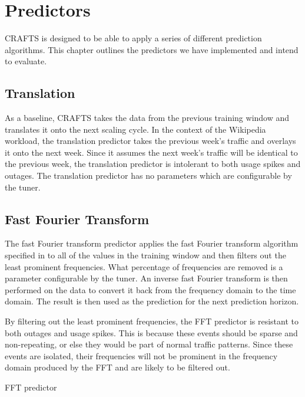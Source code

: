 \chapter{Predictors}
\label{ch:policies}
CRAFTS is designed to be able to apply a series of different prediction algorithms. This chapter outlines the predictors we have implemented and intend to evaluate.

\section{Translation}
As a baseline, CRAFTS takes the data from the previous training window and translates it onto the next scaling cycle. In the context of the Wikipedia workload, the translation predictor takes the previous week's traffic and overlays it onto the next week. Since it assumes the next week's traffic will be identical to the previous week, the translation predictor is intolerant to both usage spikes and outages. The translation predictor has no parameters which are configurable by the \textsf{tuner}.

\section{Fast Fourier Transform}
The fast Fourier transform predictor applies the fast Fourier transform algorithm specified in  to all of the values in the training window and then filters out the least prominent frequencies. What percentage of frequencies are removed is a parameter configurable by the \textsf{tuner}. An inverse fast Fourier transform is then performed on the data to convert it back from the frequency domain to the time domain. The result is then used as the prediction for the next prediction horizon. 

By filtering out the least prominent frequencies, the FFT predictor is resistant to both outages and usage spikes. This is because these events should be sparse and non-repeating, or else they would be part of normal traffic patterns. Since these events are isolated, their frequencies will not be prominent in the frequency domain produced by the FFT and are likely to be filtered out.

\begin{algorithm}[H]
\caption{FFT predictor}
\end{algorithm}

